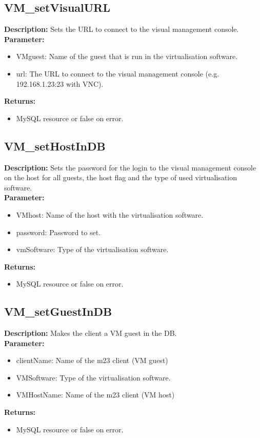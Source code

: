 \subsection{VM\_setVisualURL}
\textbf{Description:} Sets the URL to connect to the visual management console.\\
\textbf{Parameter:}
\begin{itemize}
\item VMguest: Name of the guest that is run in the virtualisation software.
\item url: The URL to connect to the visual management console (e.g. 192.168.1.23:23 with VNC).
\end{itemize}
\textbf{Returns:}
\begin{itemize}
\item MySQL resource or false on error.
\end{itemize}

\subsection{VM\_setHostInDB}
\textbf{Description:} Sets the password for the login to the visual management console on the host for all guests, the host flag and the type of used virtualisation software.\\
\textbf{Parameter:}
\begin{itemize}
\item VMhost: Name of the host with the virtualisation software.
\item password: Password to set.
\item vmSoftware: Type of the virtualisation software.
\end{itemize}
\textbf{Returns:}
\begin{itemize}
\item MySQL resource or false on error.
\end{itemize}

\subsection{VM\_setGuestInDB}
\textbf{Description:} Makes the client a VM guest in the DB.\\
\textbf{Parameter:}
\begin{itemize}
\item clientName: Name of the m23 client (VM guest)
\item VMSoftware: Type of the virtualisation software.
\item VMHostName: Name of the m23 client (VM host)
\end{itemize}
\textbf{Returns:}
\begin{itemize}
\item MySQL resource or false on error.
\end{itemize}

